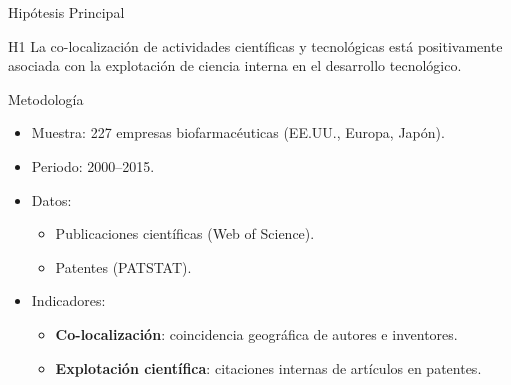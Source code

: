 \documentclass{beamer}
\begin{document}
	\begin{frame}{Hipótesis Principal}
		\begin{block}{H1}
			La co-localización de actividades científicas y tecnológicas está positivamente asociada con la explotación de ciencia interna en el desarrollo tecnológico.
		\end{block}
	\end{frame}
	
	\begin{frame}{Metodología}
		\begin{itemize}
			\item Muestra: 227 empresas biofarmacéuticas (EE.UU., Europa, Japón).
			\item Periodo: 2000–2015.
			\item Datos:
			\begin{itemize}
				\item Publicaciones científicas (Web of Science).
				\item Patentes (PATSTAT).
			\end{itemize}
			\item Indicadores:
			\begin{itemize}
				\item \textbf{Co-localización}: coincidencia geográfica de autores e inventores.
				\item \textbf{Explotación científica}: citaciones internas de artículos en patentes.
			\end{itemize}
		\end{itemize}
	\end{frame}
	
\end{document}
